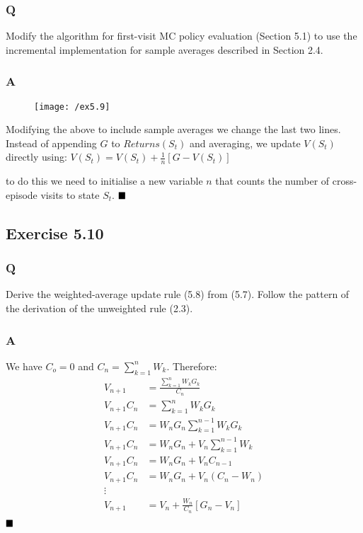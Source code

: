 \subsubsection{Q}
Modify the algorithm for first-visit MC policy evaluation (Section 5.1) to use the incremental implementation for sample averages described in Section 2.4. 
\subsubsection{A}
\begin{figure}[h!]
	\centering
	\texttt{[image: /ex5.9]}
	\label{fig:monte carlo policy eval}
\end{figure}

Modifying the above to include sample averages we change the last two lines. Instead of appending $G$ to $Returns(S_t)$ and averaging, we update $V(S_t)$ directly using:
$
V(S_t) = V(S_t) + \frac{1}{n}\left[G - V(S_t)\right]
$

to do this we need to initialise a new variable $n$ that counts the number of cross-episode visits to state $S_t$.
$
\hfill \blacksquare
$

\subsection{Exercise 5.10}
\subsubsection{Q}
Derive the weighted-average update rule (5.8) from (5.7). Follow the pattern of the derivation of the unweighted rule (2.3).
\subsubsection{A}
We have $C_o = 0$ and $C_n = \sum_{k=1}^{n} W_k$. Therefore:
\begin{align}
V_{n+1} &= \frac{\sum_{k=1}^{n}W_k G_k}{C_n}\\
V_{n+1}{C_n} &= \sum_{k=1}^{n}W_k G_k \\
V_{n+1}{C_n} &= W_n G_n \sum_{k=1}^{n-1}W_k G_k \\
V_{n+1}{C_n} &= W_n G_n + V_n \sum_{k=1}^{n-1}W_k \\
V_{n+1}{C_n} &= W_n G_n + V_n C_{n-1} \\
V_{n+1}{C_n} &= W_n G_n + V_n \left(C_n - W_n\right) \\
\vdots \\
V_{n+1} &= V_n + \frac{W_n}{C_n}\left[G_n - V_n\right] \\
\end{align}
$
\hfill \blacksquare
$

